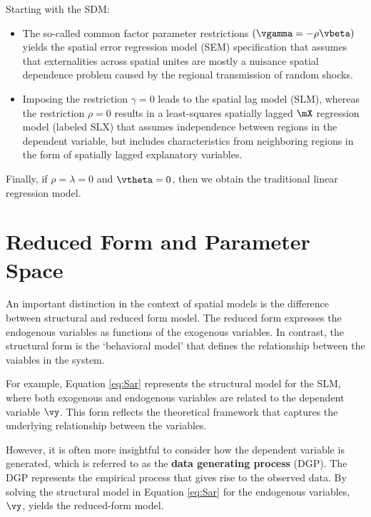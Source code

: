 \documentclass[english,12pt]{book}\usepackage[]{graphicx}\usepackage[]{xcolor}
\begin{document}
Starting with the SDM:

\begin{itemize}
  \item The so-called common factor parameter restrictions $(\vgamma = -\rho\vbeta)$ yields the spatial error regression model (SEM) specification that assumes that externalities across spatial unites are mostly a nuisance spatial dependence problem caused by the regional transmission of random shocks. 
  \item Imposing the restriction $\gamma = 0$ leads to the spatial lag model (SLM), whereas the restriction $\rho = 0$ results in a least-squares spatially lagged $\mX$ regression model (labeled SLX) that assumes independence between regions in the dependent variable, but includes characteristics from neighboring regions in the form of spatially lagged explanatory variables.  
\end{itemize}

Finally, if $\rho = \lambda = 0$ and $\vtheta = 0$, then we obtain the traditional linear regression model. 

\section{Reduced Form and Parameter Space}

An important distinction in the context of spatial models is the difference between structural and reduced form model. The reduced form expresses the endogenous variables as functions of the exogenous variables. In contrast, the structural form is the `behavioral model' that defines the relationship between the vaiables in the system.  

For example, Equation \eqref{eq:Sar} represents the structural model for the SLM, where both exogenous and endogenous variables are related to the dependent variable $\vy$. This form reflects the theoretical framework that captures the underlying relationship between the variables. 

However, it is often more insightful to consider how the dependent variable is generated, which is referred to as the \textbf{data generating process} (DGP). The DGP represents the empirical process that gives rise to the observed data. By solving the structural model in Equation \eqref{eq:Sar} for the endogenous variables, $\vy$, yields the reduced-form model. 
\end{document}
